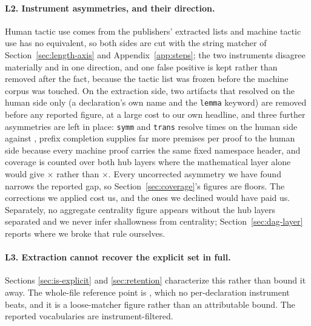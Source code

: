 \paragraph{L2. Instrument asymmetries, and their direction.} Human tactic use
comes from the publishers' extracted lists and machine tactic use has no
equivalent, so both sides are cut with the string matcher of
Section~\ref{sec:length-axis} and Appendix~\ref{app:steps}; the two instruments
disagree materially and in one direction, and one false positive is kept rather
than removed after the fact, because the tactic list was frozen before the
machine corpus was touched. On the extraction side, two artifacts that
resolved on the human side only (a declaration's own name and the
\texttt{lemma} keyword) are removed before any reported figure, at a large
cost to our own headline, and three further asymmetries are left in place: \texttt{symm} and
\texttt{trans} resolve \symmTransHuman{} times on the human side against
\symmTransMachine{}, prefix completion supplies far more premises per proof to
the human side because every machine proof carries the same fixed namespace
header, and coverage is counted over both hub layers where the mathematical
layer alone would give \vocabRatioMathOnly{}$\times$ rather than
\vocabRatio{}$\times$. Every uncorrected asymmetry we have found narrows the
reported gap, so Section~\ref{sec:coverage}'s figures are floors. The
corrections we applied cost us, and the ones we declined would have paid us.
Separately, no aggregate centrality figure appears without the hub layers
separated and we never infer shallowness from centrality;
Section~\ref{sec:dag-layer} reports where we broke that rule ourselves.

\paragraph{L3. Extraction cannot recover the explicit set in full.} Sections
\ref{sec:is-explicit} and \ref{sec:retention} characterize this rather than
bound it away. The whole-file reference point is \ceilingWholeFile{},
which no per-declaration instrument beats, and it is a loose-matcher figure
rather than an attributable bound. The reported vocabularies are
instrument-filtered.

